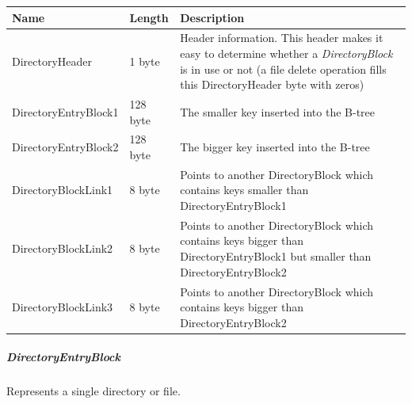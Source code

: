 \begin{tabular}{|l|l|p{5cm}|}
\hline
\textbf{Name} & \textbf{Length} & \textbf{Description}
\\  \hline

DirectoryHeader & 1 byte & Header information. This header makes it easy to
determine whether a \textit{DirectoryBlock} is in use or not (a file delete
operation fills this DirectoryHeader byte with zeros)

\\  \hline

DirectoryEntryBlock1 & 128 byte & The smaller key inserted into the
B-tree

\\  \hline

DirectoryEntryBlock2 & 128 byte & The bigger key inserted into the B-tree

\\  \hline

DirectoryBlockLink1 & 8 byte & Points to another DirectoryBlock which contains
keys smaller than DirectoryEntryBlock1

\\  \hline

DirectoryBlockLink2 & 8 byte & Points to another DirectoryBlock which contains
keys bigger than DirectoryEntryBlock1 but smaller than DirectoryEntryBlock2

\\  \hline

DirectoryBlockLink3 & 8 byte & Points to another DirectoryBlock which contains
keys bigger than DirectoryEntryBlock2

\\  \hline


\end{tabular}

\subparagraph*{DirectoryEntryBlock}

Represents a single directory or file.

